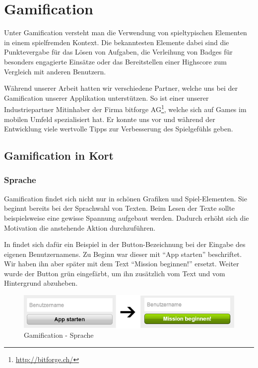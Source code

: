 \chapter{Gamification}
\label{gamification}

Unter \gls{Gamification} versteht man die Verwendung von spieltypischen Elementen in einem spielfremden Kontext.
Die bekanntesten Elemente dabei sind die Punktevergabe für das Lösen von Aufgaben, die Verleihung von Badges für besonders engagierte Einsätze oder das Bereitstellen einer Highscore zum Vergleich mit anderen Benutzern.

Während unserer Arbeit hatten wir verschiedene Partner, welche uns bei der \gls{Gamification} unserer Applikation unterstützen.
So ist einer unserer Industriepartner Mitinhaber der Firma bitforge AG\footnote{\url{http://bitforge.ch/}}, welche sich auf Games im mobilen Umfeld spezialisiert hat.
Er konnte uns vor und während der Entwicklung viele wertvolle Tipps zur Verbesserung des Spielgefühls geben.

\section{Gamification in Kort}
\subsection{Sprache}
\gls{Gamification} findet sich nicht nur in schönen Grafiken und Spiel-Elementen.
Sie beginnt bereits bei der Sprachwahl von Texten.
Beim Lesen der Texte sollte beispielsweise eine gewisse Spannung aufgebaut werden.
Dadurch erhöht sich die Motivation die anstehende Aktion durchzuführen.

In \kort{} findet sich dafür ein Beispiel in der Button-Bezeichnung bei der Eingabe des eigenen Benutzernamens.
Zu Beginn war dieser mit "`App starten"' beschriftet.
Wir haben ihn aber später mit dem Text "`Mission beginnen!"' ersetzt.
Weiter wurde der Button grün eingefärbt, um ihn zusätzlich vom Text und vom Hintergrund abzuheben.

\begin{figure}[H]
	\centering
	\includegraphics{images/gamification/gamification-lang-firststeps}
	\caption{Gamification - Sprache}
	\label{gamification-lang-firststeps}
\end{figure}

